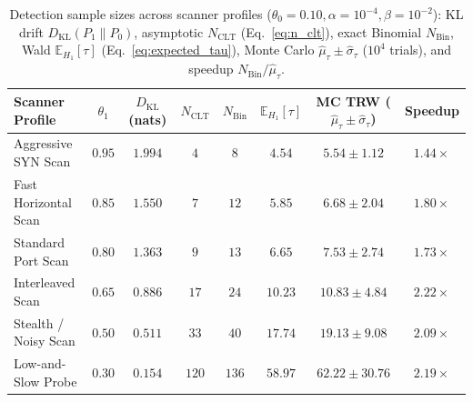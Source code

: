 \documentclass[oneside,noexaminfo,english]{sapthesis}
\numberwithin{equation}{section}
\numberwithin{figure}{section}
\numberwithin{table}{section}
\theoremstyle{compactplain}
\theoremstyle{compactdef}
\theoremstyle{compactrem}
\newcommand{\E}{\mathbb{E}}
\newcommand{\DKL}{D_{\mathrm{KL}}}
\begin{document}
\begin{table}[!htbp]
\centering
\caption{Detection sample sizes across scanner profiles ($\theta_0 = 0.10, \alpha = 10^{-4}, \beta = 10^{-2}$): KL drift $\DKL(P_1 \parallel P_0)$, asymptotic $N_{\mathrm{CLT}}$ (Eq.~\eqref{eq:n_clt}), exact Binomial $N_{\mathrm{Bin}}$, Wald $\E_{H_1}[\tau]$ (Eq.~\eqref{eq:expected_tau}), Monte Carlo $\hat{\mu}_\tau \pm \hat{\sigma}_\tau$ ($10^4$ trials), and speedup $N_{\mathrm{Bin}}/\hat{\mu}_\tau$.}
\label{tab:clt_vs_trw}
\footnotesize
\setlength{\tabcolsep}{3.5pt}
\begin{tabular*}{\textwidth}{@{\extracolsep{\fill}}lccccccc@{}}
\toprule
\textbf{Scanner Profile} & $\theta_1$ & $\DKL$ (nats) & $N_{\mathrm{CLT}}$ & $N_{\mathrm{Bin}}$ & $\E_{H_1}[\tau]$ & \textbf{MC TRW} ($\hat{\mu}_\tau \pm \hat{\sigma}_\tau$) & \textbf{Speedup} \\
\midrule
Aggressive SYN Scan  & $0.95$ & $1.994$ & $4$   & $8$   & $4.54$  & $5.54 \pm 1.12$  & $1.44\times$ \\
Fast Horizontal Scan & $0.85$ & $1.550$ & $7$   & $12$  & $5.85$  & $6.68 \pm 2.04$  & $1.80\times$ \\
Standard Port Scan   & $0.80$ & $1.363$ & $9$   & $13$  & $6.65$  & $7.53 \pm 2.74$  & $1.73\times$ \\
Interleaved Scan     & $0.65$ & $0.886$ & $17$  & $24$  & $10.23$ & $10.83 \pm 4.84$ & $2.22\times$ \\
Stealth / Noisy Scan & $0.50$ & $0.511$ & $33$  & $40$  & $17.74$ & $19.13 \pm 9.08$ & $2.09\times$ \\
Low-and-Slow Probe   & $0.30$ & $0.154$ & $120$ & $136$ & $58.97$ & $62.22 \pm 30.76$ & $2.19\times$ \\
\bottomrule
\end{tabular*}
\end{table}
\end{document}
